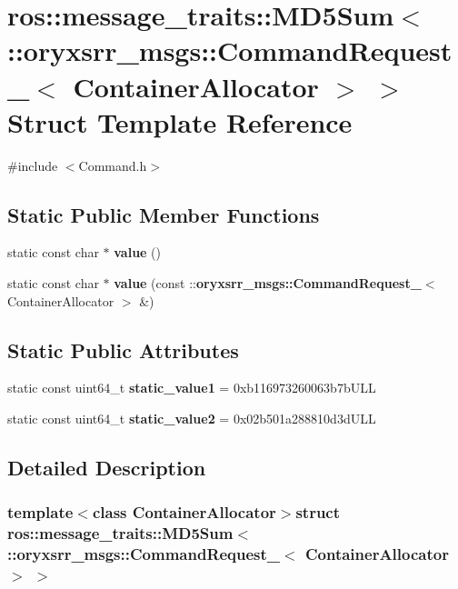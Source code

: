 \section{ros\-:\-:message\-\_\-traits\-:\-:\-M\-D5\-Sum$<$ \-:\-:oryxsrr\-\_\-msgs\-:\-:\-Command\-Request\-\_\-$<$ \-Container\-Allocator $>$ $>$ \-Struct \-Template \-Reference}
\label{structros_1_1message__traits_1_1MD5Sum_3_01_1_1oryxsrr__msgs_1_1CommandRequest___3_01ContainerAllocator_01_4_01_4}


{\ttfamily \#include $<$\-Command.\-h$>$}

\subsection*{\-Static \-Public \-Member \-Functions}
\begin{DoxyCompactItemize}
\item 
static const char $\ast$ {\bf value} ()
\item 
static const char $\ast$ {\bf value} (const \-::{\bf oryxsrr\-\_\-msgs\-::\-Command\-Request\-\_\-}$<$ \-Container\-Allocator $>$ \&)
\end{DoxyCompactItemize}
\subsection*{\-Static \-Public \-Attributes}
\begin{DoxyCompactItemize}
\item 
static const uint64\-\_\-t {\bf static\-\_\-value1} = 0xb116973260063b7b\-U\-L\-L
\item 
static const uint64\-\_\-t {\bf static\-\_\-value2} = 0x02b501a288810d3d\-U\-L\-L
\end{DoxyCompactItemize}


\subsection{\-Detailed \-Description}
\subsubsection*{template$<$class Container\-Allocator$>$struct ros\-::message\-\_\-traits\-::\-M\-D5\-Sum$<$ \-::oryxsrr\-\_\-msgs\-::\-Command\-Request\-\_\-$<$ Container\-Allocator $>$ $>$}



